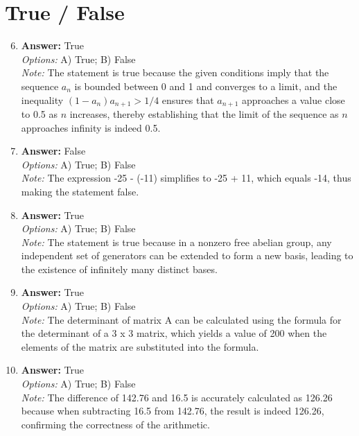 \documentclass[12pt]{article}
\begin{document}
\section*{True / False}
\begin{enumerate}[label=\arabic*.]
\setcounter{enumi}{5}
\item \textbf{Answer:} True
\\ \textit{Options:} A) True; B) False
\\ \textit{Note:} The statement is true because the given conditions imply that the sequence \( a_n \) is bounded between 0 and 1 and converges to a limit, and the inequality \( (1-a_n)a_{n+1} > 1/4 \) ensures that \( a_{n+1} \) approaches a value close to 0.5 as \( n \) increases, thereby establishing that the limit of the sequence as \( n \) approaches infinity is indeed 0.5.
\item \textbf{Answer:} False
\\ \textit{Options:} A) True; B) False
\\ \textit{Note:} The expression -25 - (-11) simplifies to -25 + 11, which equals -14, thus making the statement false.
\item \textbf{Answer:} True
\\ \textit{Options:} A) True; B) False
\\ \textit{Note:} The statement is true because in a nonzero free abelian group, any independent set of generators can be extended to form a new basis, leading to the existence of infinitely many distinct bases.
\item \textbf{Answer:} True
\\ \textit{Options:} A) True; B) False
\\ \textit{Note:} The determinant of matrix A can be calculated using the formula for the determinant of a 3 x 3 matrix, which yields a value of 200 when the elements of the matrix are substituted into the formula.
\item \textbf{Answer:} True
\\ \textit{Options:} A) True; B) False
\\ \textit{Note:} The difference of 142.76 and 16.5 is accurately calculated as 126.26 because when subtracting 16.5 from 142.76, the result is indeed 126.26, confirming the correctness of the arithmetic.
\end{enumerate}
\end{document}

